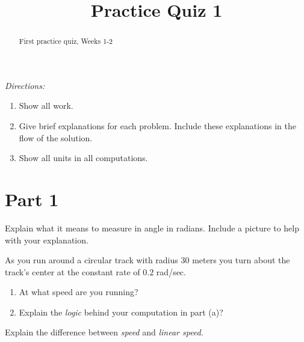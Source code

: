 \documentclass{ximera}
\title{Practice Quiz 1}
\begin{document}
\begin{abstract}
First practice quiz, Weeks 1-2
\end{abstract}
\maketitle

\emph{Directions:}

\begin{enumerate}
\item Show all work.

\item Give brief explanations for each problem. Include these explanations in the flow of the solution.

\item Show all units in all computations.
\end{enumerate}


\section{Part 1}

\begin{question}  \label{Qdgfg4thhnn}
Explain what it means to measure in angle in radians. Include a picture to help with your explanation.
\end{question}

\begin{question}  \label{Q5543hghhjmmm}
 As you run around a circular track with radius $30$ meters you turn about the track's center at the constant rate of $0.2$ rad/sec.

\begin{enumerate}
\item At what speed are you running?

\item Explain the \emph{logic} behind your computation in part (a)?

\end{enumerate}
\end{question}


\begin{question}  \label{Qcvfg44f}
Explain the difference between \emph{speed} and \emph{linear speed}.
\end{question}
\end{document}
